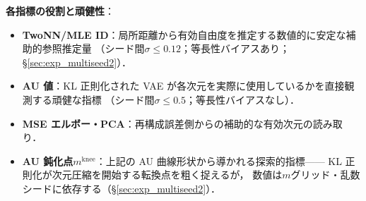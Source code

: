 \documentclass[11pt,a4paper]{jsarticle}
\newcommand{\mknee}{m^{\mathrm{knee}}}
\begin{document}
\textbf{各指標の役割と頑健性}：
\begin{itemize}
  \item \textbf{TwoNN/MLE ID}：局所距離から有効自由度を推定する数値的に安定な補助的参照推定量
        （シード間$\sigma \leq 0.12$；等長性バイアスあり；§\ref{sec:exp_multiseed2}）．
  \item \textbf{AU 値}：KL 正則化された VAE が各次元を実際に使用しているかを直接観測する頑健な指標
        （シード間$\sigma \leq 0.5$；等長性バイアスなし）．
  \item \textbf{MSE エルボー・PCA}：再構成誤差側からの補助的な有効次元の読み取り．
  \item \textbf{AU 鈍化点$\mknee$}：上記の AU 曲線形状から導かれる探索的指標——
        KL 正則化が次元圧縮を開始する転換点を粗く捉えるが，
        数値は$m$グリッド・乱数シードに依存する（§\ref{sec:exp_multiseed2}）．
\end{itemize}
\end{document}
